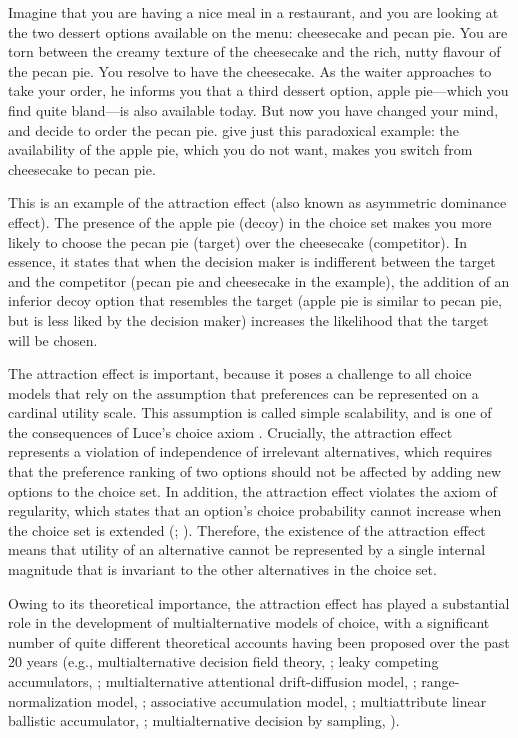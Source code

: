 \documentclass[12pt, a4paper]{article}
\begin{document}
Imagine that you are having a nice meal in a restaurant, and you are looking at the two dessert options available on the menu: cheesecake and pecan pie. You are torn between the creamy texture of the cheesecake and the rich, nutty flavour of the pecan pie. You resolve to have the cheesecake. As the waiter approaches to take your order, he informs you that a third dessert option, apple pie---which you find quite bland---is also available today. But now you have changed your mind, and decide to order the pecan pie.  give just this paradoxical example: the availability of the apple pie, which you do not want, makes you switch from cheesecake to pecan pie.

This is an example of the attraction effect (also known as asymmetric dominance effect). The presence of the apple pie (decoy) in the choice set makes you more likely to choose the pecan pie (target) over the cheesecake (competitor). In essence, it states that when the decision maker is indifferent between the target and the competitor (pecan pie and cheesecake in the example), the addition of an inferior decoy option that resembles the target (apple pie is similar to pecan pie, but is less liked by the decision maker) increases the likelihood that the target will be chosen.


The attraction effect is important, because it poses a challenge to all choice models that rely on the assumption that preferences can be represented on a cardinal utility scale. This assumption is called simple scalability, and is one of the consequences of Luce's choice axiom \cite{Luce1959}. Crucially, the attraction effect represents a violation of independence of irrelevant alternatives, which requires that the preference ranking of two options should not be affected by adding new options to the choice set. In addition, the attraction effect violates the axiom of regularity, which states that an option's choice probability cannot increase when the choice set is extended (; ). Therefore, the existence of the attraction effect means that utility of an alternative cannot be represented by a single internal magnitude that is invariant to the other alternatives in the choice set. 

Owing to its theoretical importance, the attraction effect has played a substantial role in the development of multialternative models of choice, with a significant number of quite different theoretical accounts having been proposed over the past 20 years (e.g., multialternative decision field theory, ; leaky competing accumulators, ; multialternative attentional drift-diffusion model,   ; range-normalization model, ; associative accumulation model, ; multiattribute linear ballistic accumulator, ; multialternative decision by sampling, ). 
\end{document}
